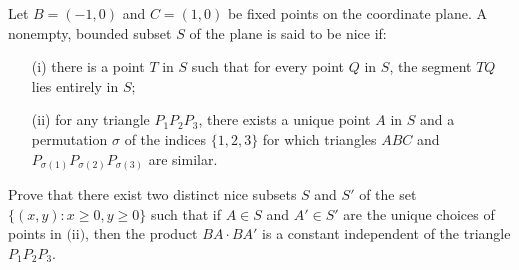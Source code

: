 Let 
$B = (-1, 0)$
 and 
$C = (1, 0)$
 be fixed points on the coordinate plane. A nonempty, bounded subset 
$S$
 of the plane is said to be 
nice
 if:
 
\begin{itemize}
    \item[(i)] there is a point 
    $T$
     in 
    $S$
     such that for every point 
    $Q$
     in 
    $S$, 
     the segment 
    $TQ$
     lies entirely in 
    $S$;
    
    \item[(ii)]  for any triangle 
    $P_1P_2P_3$, 
     there exists a unique point 
    $A$
     in 
    $S$
     and a permutation 
    $\sigma$
     of the indices 
    $\{1, 2, 3\}$
     for which triangles 
    $ABC$
     and 
    $P_{\sigma(1)}P_{\sigma(2)}P_{\sigma(3)}$
     are similar.
\end{itemize}

Prove that there exist two distinct nice subsets 
$S$
 and 
$S'$
 of the set 
$\{(x, y) : x \geq 0, y \geq 0\}$
 such that if 
$A \in S$
 and 
$A' \in S'$
 are the unique choices of points in 
$\text{(ii)}$, 
 then the product 
$BA \cdot BA'$
 is a constant independent of the triangle 
$P_1P_2P_3$. 
